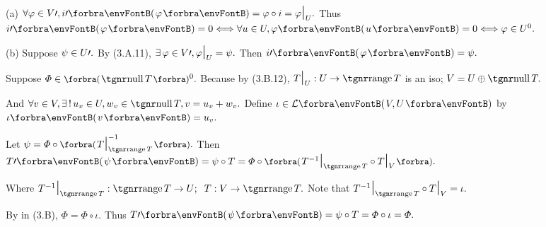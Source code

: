 \documentclass[a4paper, 11pt, UTF8]{article}
\begin{document}
\begin{large}
\par\quad
(a) $\forall\varphi\in V\apostrophe,i\apostrophe\Par{\varphi}=\varphi\circ i=\varphi\mid_U.$ Thus $i\apostrophe\Par{\varphi}=0\Longleftrightarrow\forall u\in U,\varphi\Par{u}=0\Longleftrightarrow\varphi\in U^0.$\par\quad
(b) Suppose $\psi\in U\prime.$ By (3.A.11), $\exists\,\varphi\in V\prime,\varphi\text{\Large|}_U=\psi.$ Then $i\apostrophe\Par{\varphi}=\psi.$\PfEnd
\SepLine

\par\quad
Suppose $\varPhi\in\BigPar{\null T}{^0}.$ Because by (3.B.12), $T\mid_U:U\rightarrow\range T$ is an iso; $V=U\oplus\null T.$\par\quad
And $\forall v\in V,\exists\,!\,u_v\in U,w_v\in\null T,v=u_v+w_v.$ Define $\iota\in\Lm{V,U}$ by $\iota\Par{v}=u_v.$\vspace{4pt}\par\quad
Let $\psi=\varPhi\circ\BigPar{T\mid_{\range T}^{-1}}.$ Then $T\apostrophe\Par{\psi}=\psi\circ T=\varPhi\circ\BigPar{T^{-1}\mid_{\range T}\circ T\mid_V}.$\vspace{2pt}\par\quad
Where $T^{-1}\mid_{\range T}:\range T\rightarrow U;\;\;T:V\rightarrow\range T.$ Note that $T^{-1}\mid_{\range T}\circ T\mid_V=\iota.$\vspace{2pt}\par\quad
By \TIPS in (3.B), $\varPhi=\varPhi\circ \iota.$ Thus $T\apostrophe\Par{\psi}=\psi\circ T=\varPhi\circ{\iota}=\varPhi.$\PfEnd
\SepLine


\end{large}
\end{document}
